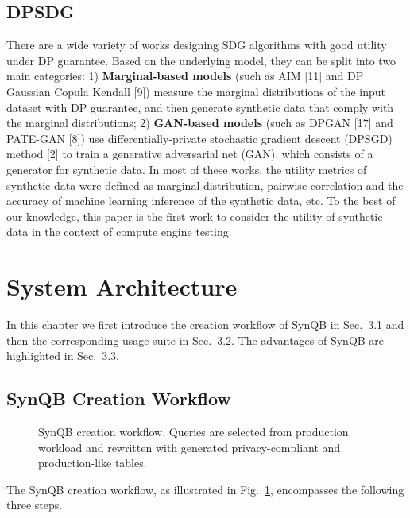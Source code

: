 \documentclass[11pt]{article}
\begin{document}
\subsection{DPSDG}
There are a wide variety of works designing SDG algorithms with
good utility under DP guarantee. Based on the underlying model,
they can be split into two main categories: 1) \textbf{Marginal-based
models} (such as AIM [11] and DP Gaussian Copula Kendall [9])
measure the marginal distributions of the input dataset with DP
guarantee, and then generate synthetic data that comply with the
marginal distributions; 2) \textbf{GAN-based models} (such as DPGAN
[17] and PATE-GAN [8]) use differentially-private stochastic gradient
descent (DPSGD) method [2] to train a generative adversarial
net (GAN), which consists of a generator for synthetic data. In most
of these works, the utility metrics of synthetic data were defined
as marginal distribution, pairwise correlation and the accuracy of
machine learning inference of the synthetic data, etc. To the best of
our knowledge, this paper is the first work to consider the utility
of synthetic data in the context of compute engine testing.

\section{System Architecture}
In this chapter we first introduce the creation workflow of SynQB
in Sec.~3.1 and then the corresponding usage suite in Sec.~3.2. The
advantages of SynQB are highlighted in Sec.~3.3.

\subsection{SynQB Creation Workflow}

\begin{figure}[h]
\centering
{}
\caption{SynQB creation workflow. Queries are selected from
production workload and rewritten with generated privacy-compliant
and production-like tables.}
\label{fig:creation}
\end{figure}

The SynQB creation workflow, as illustrated in Fig.~\ref{fig:creation},
encompasses the following three steps.
\end{document}
